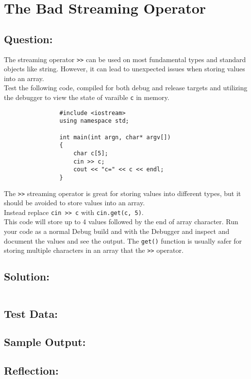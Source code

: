 \documentclass[Lab-B.tex]{subfiles}
\begin{document}
    \section{The Bad Streaming Operator}
        \subsection*{Question:}
            The streaming operator \texttt{>>} can be used on most fundamental types and standard objects like string. However, 
            it can lead to unexpected issues when storing values into an array.\\

            Test the following code, compiled for both debug and release targets and 
            utilizing the debugger to view the state of varaible \texttt{c} in memory. \\
    
            \begin{verbatim}
                #include <iostream>
                using namespace std;

                int main(int argn, char* argv[])
                {
                    char c[5];
                    cin >> c;
                    cout << "c=" << c << endl;
                }
            \end{verbatim}

            The \texttt{>>} streaming operator is great for storing values into different types, 
            but it should be avoided to store values into an array.\\

            Instead replace \texttt{cin >> c} with \texttt{cin.get(c, 5)}.\\
            This code will store up to 4 values followed by the end of array character. 
            Run your code as a normal Debug build and with the Debugger and inspect and document the values and see the output. 
            The \texttt{get()} function is usually safer for storing multiple characters in an array that the \texttt{>>} operator.
            
        \subsection*{Solution:}
            \inputminted{cpp}{../02-Bad-Streaming/Bad-Streaming.cpp}%

        \subsection*{Test Data:}
        
        \subsection*{Sample Output:}

        \subsection*{Reflection:}
\end{document}
